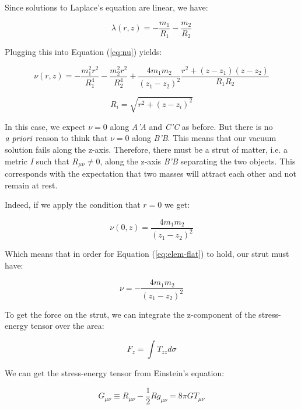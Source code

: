 \documentclass{article}
\begin{document}
Since solutions to Laplace's equation are linear, we have:

\begin{equation}
\lambda (r,z)=-\frac{m_{1}}{R_{1}}-\frac{m_{2}}{R_{2}}\label{eq:2-m}
\end{equation}

Plugging this into Equation (\ref{eq:nu}) yields:

\begin{equation}
\nu (r,z)=-\frac{m_{1}^{2}r^{2}}{R_{1}^{4}}-\frac{m_{2}^{2}r^{2}}{R_{2}^{4}}+\frac{4m_{1}m_{2}}{\left(z_{1}-z_{2}\right)^{2}}\frac{r^{2}+\left(z-z_{1}\right)\left(z-z_{2}\right)}{R_{1}R_{2}}
\end{equation}

\begin{equation}
R_{i}=\sqrt{r^{2}+\left(z-z_{i}\right)^{2}}
\end{equation}

In this case, we expect $\nu=0$ along \emph{A'A} and \emph{C'C} as before. But there is no $\emph{a priori}$ reason to think that $\nu=0$ along \emph{B'B}.
This means that our vacuum solution fails along the z-axis. Therefore, there must be a strut of matter, i.e. a metric \emph{I} such that $R_{\mu\nu}\neq 0$, along the z-axis \emph{B'B} separating the two objects. This corresponds with the expectation that two masses will attract each other and not remain at rest.

Indeed, if we apply the condition that $r=0$ we get:

\begin{equation}
\nu (0,z)=\frac{4m_{1}m_{2}}{\left(z_{1}-z_{2}\right)^{2}}\label{eq:nu_r=0}
\end{equation}

Which means that in order for Equation (\ref{eq:elem-flat}) to hold, our strut must have:

\begin{equation}
\nu=-\frac{4m_{1}m_{2}}{\left(z_{1}-z_{2}\right)^{2}}
\end{equation}

To get the force on the strut, we can integrate the z-component of the stress-energy tensor over the area:

\begin{equation}
F_{z}=\int T_{zz}d\sigma
\end{equation}

We can get the stress-energy tensor from Einstein's equation:

\begin{equation}
G_{\mu\nu}\equiv R_{\mu\nu}-\frac{1}{2}Rg_{\mu\nu}=8\pi GT_{\mu\nu}\label{eq:einstein}
\end{equation}
\end{document}
